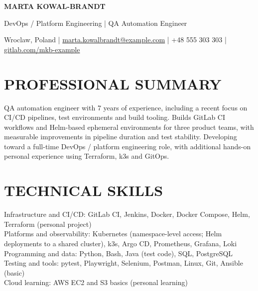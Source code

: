 \documentclass[11pt,a4paper]{article}
\begin{document}
{\centering
{\Huge\bfseries\color{primarycolor} MARTA KOWAL-BRANDT}\par
\vspace{0.25em}
{\large DevOps / Platform Engineering | QA Automation Engineer}\par
\vspace{0.2em}
Wroclaw, Poland | \href{mailto:marta.kowalbrandt@example.com}{marta.kowalbrandt@example.com} | +48 555 303 303 | \href{https://gitlab.com/mkb-example}{gitlab.com/mkb-example}\par
}
\vspace{0.6em}

\section*{PROFESSIONAL SUMMARY}
QA automation engineer with 7 years of experience, including a recent focus on CI/CD pipelines, test environments and build tooling. Builds GitLab CI workflows and Helm-based ephemeral environments for three product teams, with measurable improvements in pipeline duration and test stability. Developing toward a full-time DevOps / platform engineering role, with additional hands-on personal experience using Terraform, k3s and GitOps.

\section*{TECHNICAL SKILLS}
Infrastructure and CI/CD: GitLab CI, Jenkins, Docker, Docker Compose, Helm, Terraform (personal project)\\
Platforms and observability: Kubernetes (namespace-level access; Helm deployments to a shared cluster), k3s, Argo CD, Prometheus, Grafana, Loki\\
Programming and data: Python, Bash, Java (test code), SQL, PostgreSQL\\
Testing and tools: pytest, Playwright, Selenium, Postman, Linux, Git, Ansible (basic)\\
Cloud learning: AWS EC2 and S3 basics (personal learning)
\end{document}
